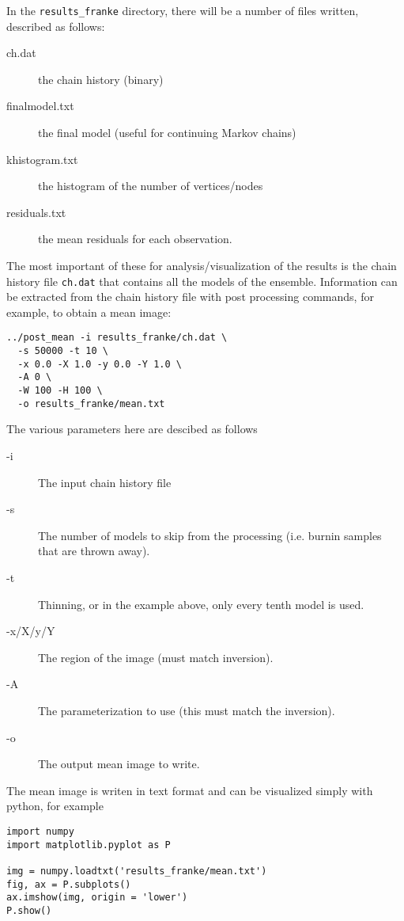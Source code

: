 \documentclass[a4paper,12pt]{article}
\begin{document}
In the {\tt results\_franke} directory, there will be a number of files written,
described as follows:

\begin{description}
\item[ch.dat] the chain history (binary)
\item[finalmodel.txt] the final model (useful for continuing Markov chains)
\item[khistogram.txt] the histogram of the number of vertices/nodes
\item[residuals.txt] the mean residuals for each observation.
\end{description}

The most important of these for analysis/visualization of the results is the chain
history file {\tt ch.dat} that contains all the models of the ensemble.
Information can be extracted from the chain history file with post processing
commands, for example, to obtain a mean image:

\begin{verbatim}
../post_mean -i results_franke/ch.dat \
  -s 50000 -t 10 \
  -x 0.0 -X 1.0 -y 0.0 -Y 1.0 \
  -A 0 \
  -W 100 -H 100 \
  -o results_franke/mean.txt
\end{verbatim}

The various parameters here are descibed as follows

\begin{description}
\item[-i] The input chain history file
\item[-s] The number of models to skip from the processing (i.e. burnin samples that
  are thrown away).
\item[-t] Thinning, or in the example above, only every tenth model is used.
\item[-x/X/y/Y] The region of the image (must match inversion).
\item[-A] The parameterization to use (this must match the inversion).
\item[-o] The output mean image to write.
\end{description}

The mean image is writen in text format and can be visualized simply
with python, for example

\begin{verbatim}
import numpy
import matplotlib.pyplot as P

img = numpy.loadtxt('results_franke/mean.txt')
fig, ax = P.subplots()
ax.imshow(img, origin = 'lower')
P.show()
\end{verbatim}
\end{document}
